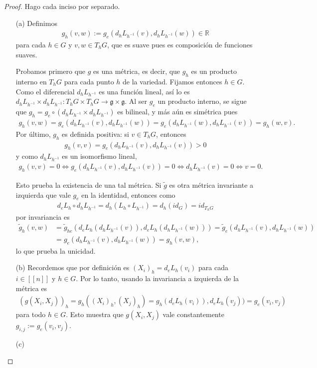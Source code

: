 \documentclass[11pt]{article}
\newcommand{\R}{\mathbb{R}}
\newcommand{\nat}[1]{[\![#1]\!]}
\begin{document}
\begin{proof} Hago cada inciso por separado. 
\begin{itemize}[listparindent = \parindent]
\item[(a)] Definimos
\begin{align*}
g_h(v,w) := g_e(d_hL_{h^{-1}}(v),d_hL_{h^{-1}}(w)) \in \R
\end{align*}
para cada $h \in G$ y $v,w \in T_hG$, que es suave pues es composición de funciones suaves.  

Probamos primero que $g$ es una métrica, es decir, que $g_h$ es un producto interno en $T_hG$ para cada punto $h$ de la variedad. Fijamos entonces $h \in G$. Como el diferencial $d_hL_{h^{-1}}$ es una función lineal, así lo es $d_hL_{h^{-1}} \times d_hL_{h^{-1}} : T_hG \times T_hG \to \mathfrak{g} \times \mathfrak{g}$. Al ser $g_e$ un producto interno, se sigue que $g_h = g_e \circ (d_hL_{h^{-1}} \times d_hL_{h^{-1}})$ es bilineal, y más aún es simétrica pues 
\begin{align*}
g_h(v,w) = g_e(d_hL_{h^{-1}}(v),d_hL_{h^{-1}}(w)) = g_e(d_hL_{h^{-1}}(w),d_hL_{h^{-1}}(v)) = g_h(w,v).
\end{align*}
Por último, $g_h$ es definida positiva: si $v \in T_hG$, entonces
\begin{align*}
g_h(v,v) = g_e(d_hL_{h^{-1}}(v),d_hL_{h^{-1}}(v)) > 0
\end{align*}
y como $d_hL_{h^{-1}}$ es un isomorfismo lineal,
\begin{align*}
g_h(v,v) = 0\iff g_e(d_hL_{h^{-1}}(v),d_hL_{h^{-1}}(v)) = 0 \iff d_hL_{h^{-1}}(v) = 0\iff v = 0.
\end{align*}

Esto prueba la existencia de una tal métrica. Si $\widetilde{g}$ es otra métrica invariante a izquierda que vale $g_e$ en la identidad, entonces como
\begin{align*}
d_eL_h \circ d_hL_{h^{-1}} = d_h(L_h \circ L_{h^{-1}}) = d_h(id_G) = id_{T_hG} 
\end{align*}
por invariancia es
\begin{align*}
\widetilde{g}_h(v,w) &= \widetilde{g}_{he}(d_eL_h(d_hL_{h^{-1}}(v)),d_eL_h(d_hL_{h^{-1}}(w)))= \widetilde{g}_e(d_hL_{h^{-1}}(v),d_hL_{h^{-1}}(w))\\&= g_e(d_hL_{h^{-1}}(v),d_hL_{h^{-1}}(w)) = g_h(v,w),
\end{align*}
lo que prueba la unicidad.
\item[(b)] Recordemos que por definición es $(X_i)_h = d_eL_h(v_i)$ para cada $i \in \nat{n}$ y $h \in G$. Por lo tanto, usando la invariancia a izquierda de la métrica es
\begin{align*}
(g(X_i,X_j))_h = g_h((X_i)_h,(X_j)_h) = g_h(d_eL_h(v_i)),d_eL_h(v_j)) = g_e(v_i,v_j)
\end{align*}
para todo $h \in G$. Esto muestra que $g(X_i,X_j)$ vale constantemente $g_{i,j} := g_e(v_i,v_j)$.
\item[(c)]  
\end{itemize}
\end{proof}
\end{document}

